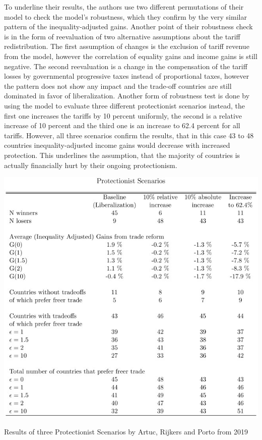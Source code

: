 To underline their results, the authors use two different permutations of their model to check the model's robustness, which they
confirm by the very similar pattern of the inequality-adjusted gains. Another point of their robustness check is in the form of 
reevaluation of two alternative assumptions about the tariff redistribution. The first assumption of changes is the exclusion of 
tariff revenue from the model, however the correlation of equality gains and income gains is still negative. The second
reevaluation is a change in the compensation of the tariff losses by governmental progressive taxes instead of proportional
taxes, however the pattern does not show any impact and the trade-off countries are still dominated in favor of 
liberalization.
Another form of robustness test is done by using the model to evaluate three different protectionist scenarios instead,
the first one increases the tariffs by 10 percent uniformly, the second is a relative increase of 10 percent and the third
one is an increase to 62.4 percent for all tariffs. However, all three scenarios confirm the results, that in this case
43 to 48 countries inequality-adjusted income gains would decrease with increased protection. This underlines the assumption,
that the majority of countries is actually financially hurt by their ongoing protectionism.
\begin{table}[h!]
    \centering
    \includegraphics*[width=\textwidth]{graphics/protectionist.jpg}
    \caption{Results of three Protectionist Scenarios by Artuc, Rijkers and Porto from 2019}
    \label{table:protectionist}
\end{table}\\
